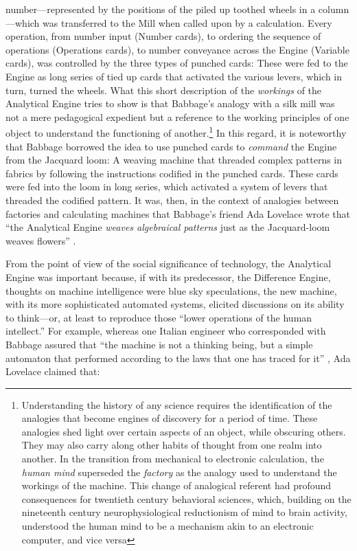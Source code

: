 \documentclass[version=last,draft=false,paper=A4,portrait,twoside=true,twocolumn=false,headinclude=false,footinclude=false,mpinclude=true,fontsize=12,BCOR=20mm,DIV=calc,pagesize=auto,open=right,chapterprefix=true,numbers=autoendperiod,headsepline=false,headings=twolinechapter,parskip=false]{scrbook}
\begin{document}
number---represented by the positions of the piled up toothed wheels in a
column---which was transferred to the Mill when called upon by a
calculation. Every operation, from number input (Number cards), to ordering
the sequence of operations (Operations cards), to number conveyance across
the Engine (Variable cards), was controlled by the three types of punched
cards: These were fed to the Engine as long series of tied up cards that
activated the various levers, which in turn, turned the wheels. What this
short description of the \emph{workings} of the Analytical Engine tries to show is
that Babbage's analogy with a silk mill was not a mere pedagogical
expedient but a reference to the working principles of one object to
understand the functioning of another.\footnote{Understanding the history of any science requires the
identification of the analogies that become engines of discovery for a
period of time. These analogies shed light over certain aspects of an
object, while obscuring others. They may also carry along other habits of
thought from one realm into another. In the transition from mechanical to
electronic calculation, the \emph{human mind} superseded the \emph{factory} as the
analogy used to understand the workings of the machine. This change of
analogical referent had profound consequences for twentieth century
behavioral sciences, which, building on the nineteenth century
neurophysiological reductionism of mind to brain activity, understood the
human mind to be a mechanism akin to an electronic computer, and vice versa} In this regard, it is
noteworthy that Babbage borrowed the idea to use punched cards to \emph{command}
the Engine from the Jacquard loom: A weaving machine that threaded complex
patterns in fabrics by following the instructions codified in the punched
cards. These cards were fed into the loom in long series, which activated a
system of levers that threaded the codified pattern. It was, then, in the
context of analogies between factories and calculating machines that
Babbage's friend Ada Lovelace wrote that ``the Analytical Engine \emph{weaves
algebraical patterns} just as the Jacquard-loom weaves flowers''
\autocite[p. 25]{lovelace1843}.

From the point of view of the social significance of technology, the
Analytical Engine was important because, if with its predecessor, the
Difference Engine, thoughts on machine intelligence were blue sky
speculations, the new machine, with its more sophisticated automated
systems, elicited discussions on its ability to think---or, at least to
reproduce those ``lower operations of the human intellect.'' For example,
whereas one Italian engineer who corresponded with Babbage assured that
``the machine is not a thinking being, but a simple automaton that
performed according to the laws that one has traced for it''
\autocite[my translation, p. 358]{menabrea1842}, Ada Lovelace claimed
that:
\end{document}
